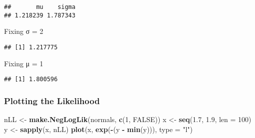\documentclass[
]{article}
\newenvironment{Shaded}{\begin{snugshade}}{\end{snugshade}}
\newcommand{\AttributeTok}[1]{\textcolor[rgb]{0.13,0.29,0.53}{#1}}
\newcommand{\ConstantTok}[1]{\textcolor[rgb]{0.56,0.35,0.01}{#1}}
\newcommand{\DecValTok}[1]{\textcolor[rgb]{0.00,0.00,0.81}{#1}}
\newcommand{\FloatTok}[1]{\textcolor[rgb]{0.00,0.00,0.81}{#1}}
\newcommand{\FunctionTok}[1]{\textcolor[rgb]{0.13,0.29,0.53}{\textbf{#1}}}
\newcommand{\NormalTok}[1]{#1}
\newcommand{\OtherTok}[1]{\textcolor[rgb]{0.56,0.35,0.01}{#1}}
\newcommand{\SpecialCharTok}[1]{\textcolor[rgb]{0.81,0.36,0.00}{\textbf{#1}}}
\newcommand{\StringTok}[1]{\textcolor[rgb]{0.31,0.60,0.02}{#1}}
\begin{document}
\begin{verbatim}
##       mu    sigma 
## 1.218239 1.787343
\end{verbatim}

Fixing σ = 2

\begin{Shaded}
\end{Shaded}

\begin{verbatim}
## [1] 1.217775
\end{verbatim}

Fixing μ = 1

\begin{Shaded}
\end{Shaded}

\begin{verbatim}
## [1] 1.800596
\end{verbatim}

\hypertarget{plotting-the-likelihood}{%
\subsubsection{Plotting the Likelihood}\label{plotting-the-likelihood}}

\begin{Shaded}
\begin{Highlighting}[]
\NormalTok{nLL }\OtherTok{\textless{}{-}} \FunctionTok{make.NegLogLik}\NormalTok{(normals, }\FunctionTok{c}\NormalTok{(}\DecValTok{1}\NormalTok{, }\ConstantTok{FALSE}\NormalTok{)) }
\NormalTok{x }\OtherTok{\textless{}{-}} \FunctionTok{seq}\NormalTok{(}\FloatTok{1.7}\NormalTok{, }\FloatTok{1.9}\NormalTok{, }\AttributeTok{len =} \DecValTok{100}\NormalTok{)}
\NormalTok{y }\OtherTok{\textless{}{-}} \FunctionTok{sapply}\NormalTok{(x, nLL)}
\FunctionTok{plot}\NormalTok{(x, }\FunctionTok{exp}\NormalTok{(}\SpecialCharTok{{-}}\NormalTok{(y }\SpecialCharTok{{-}} \FunctionTok{min}\NormalTok{(y))), }\AttributeTok{type =} \StringTok{"l"}\NormalTok{)}
\end{Highlighting}
\end{Shaded}
\end{document}
